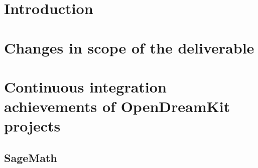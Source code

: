 \documentclass{deliverablereport}
\author{Erik Bray, et. al.}
\begin{document}
\maketitle

\hypertarget{introduction}{%
\section{Introduction}\label{introduction}}

\hypertarget{changes-to-deliverable}{%
\section{Changes in scope of the deliverable}\label{changes-to-deliverable}}

%
%
%
%
%


\hypertarget{project-reports}{%
\section{Continuous integration achievements of OpenDreamKit projects}\label{project-reports}}

\subsection{SageMath}

\end{document}
